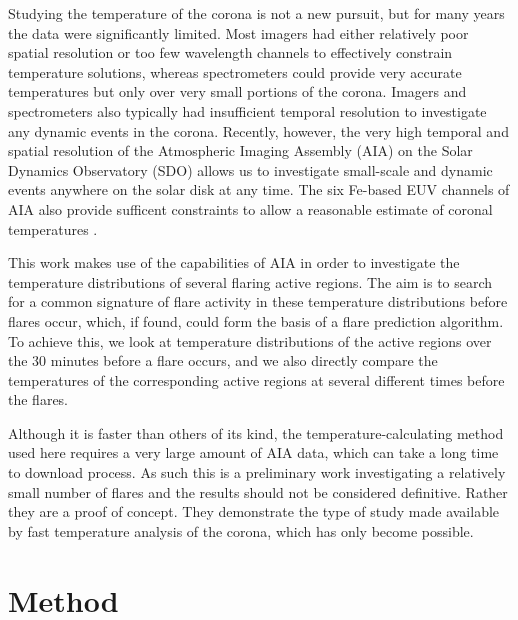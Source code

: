 \documentclass[referee,a4paper,12pt]{swsc}
\begin{document}
\begin{linenumbers}
Studying the temperature of the corona is not a new pursuit, but for many years the data were significantly limited.
Most imagers had either relatively poor spatial resolution or too few wavelength channels to effectively constrain temperature solutions, whereas spectrometers could provide very accurate temperatures but only over very small portions of the corona.
Imagers and spectrometers also typically had insufficient temporal resolution to investigate any dynamic events in the corona. %
Recently, however, the very high temporal and spatial resolution of the Atmospheric Imaging Assembly (AIA) on the Solar Dynamics Observatory (SDO) allows us to investigate small-scale and dynamic events anywhere on the solar disk at any time.
The six Fe-based EUV channels of AIA also provide sufficent constraints to allow a reasonable estimate of coronal temperatures \citep{Guennou2012, Guennou2012a}.

This work makes use of the capabilities of AIA in order to investigate the temperature distributions of several flaring active regions.
The aim is to search for a common signature of flare activity in these temperature distributions before flares occur, which, if found, could form the basis of a flare prediction algorithm.
To achieve this, we look at temperature distributions of the active regions over the 30 minutes before a flare occurs, and we also directly compare the temperatures of the corresponding active regions at several different times before the flares.

Although it is faster than others of its kind, the temperature-calculating method used here requires a very large amount of AIA data, which can take a long time to download process.
As such this is a preliminary work investigating a relatively small number of flares and the results should not be considered definitive.
Rather they are a proof of concept.
They demonstrate the type of study made available by fast temperature analysis of the corona, which has only become possible. %

\section{Method}

\end{linenumbers}
\end{document}
